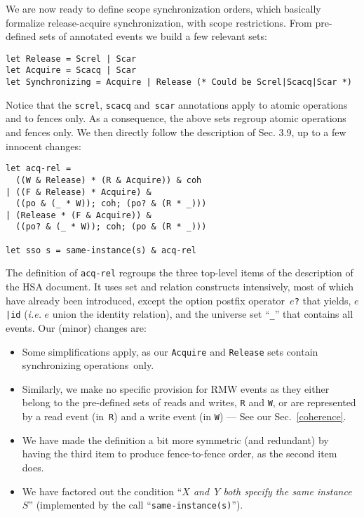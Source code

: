 \documentclass[a4paper]{article}
\begin{document}
We are now ready to define scope synchronization orders, which basically
formalize release-acquire synchronization, with scope restrictions.
From \herd{} pre-defined sets of annotated events we build a few
relevant sets:
\begin{verbatim}
let Release = Screl | Scar
let Acquire = Scacq | Scar
let Synchronizing = Acquire | Release (* Could be Screl|Scacq|Scar *)
\end{verbatim}
Notice that the \texttt{screl}, \texttt{scacq} and~\texttt{scar}
annotations apply to atomic operations and to fences only. As a consequence,
the above sets regroup atomic operations and fences only. 
We then directly follow the description of Sec. 3.9, up to a few innocent
changes:
\begin{verbatim}
let acq-rel =
  ((W & Release) * (R & Acquire)) & coh
| ((F & Release) * Acquire) &
  ((po & (_ * W)); coh; (po? & (R * _)))
| (Release * (F & Acquire)) &
  ((po? & (_ * W)); coh; (po & (R * _)))

let sso s = same-instance(s) & acq-rel  
\end{verbatim}
The definition of \texttt{acq-rel} regroups the three top-level items
of the description of the HSA document.
It uses set and relation constructs intensively, most of which have
already been introduced, except the option postfix
operator~\texttt{$e$?} that yields,
\texttt{$e$|id} (\emph{i.e.} $e$ union the identity relation),
and the universe set ``\verb+_+'' that contains all events.
Our (minor) changes are:
\begin{itemize}
\item Some simplifications apply,
as our \texttt{Acquire} and \texttt{Release} sets
contain synchronizing operations~only.
\item Similarly, we make no specific provision for
RMW events as they either belong to the pre-defined sets of reads and writes,
\verb+R+ and \verb+W+, or are represented by a read event (in~\verb+R+)
and a write event (in \verb+W+) --- See our Sec.~\ref{coherence}.
\item We have made the definition a bit more symmetric (and redundant)
by having the third item to produce fence-to-fence order,
as the second item does.
\item We have factored out the condition ``\emph{$X$ and~$Y$ both specify the same instance~$S$}'' (implemented by the call ``\verb+same-instance(s)+'').
\end{itemize}
\end{document}
